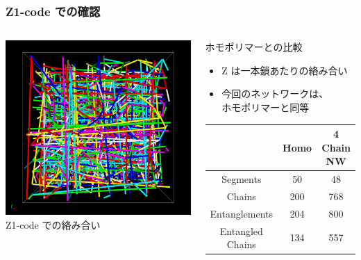 \documentclass[12pt, dvipdfmx]{beamer}
\begin{document}
\begin{frame}
    \frametitle{Z1-code での確認}
        \vspace{-3mm}
        \begin{columns}[T, onlytextwidth]
                \includegraphics[width=\textwidth]{z_cord_4Chain.png}
                Z1-code での絡み合い
            \begin{block}{ホモポリマーとの比較}
                \begin{itemize}
                    \item Z は一本鎖あたりの絡み合い
                    \item 今回のネットワークは、\\ホモポリマーと同等
                \end{itemize}
                \scriptsize
                \begin{center}
                    \begin{tabular}{c||c|c} \hline
                        &Homo & 4 Chain NW \\ \hline \hline
                        Segments& 50& 48 \\ \hline
                        Chains & 200& 768 \\ \hline
                        Entanglements& 204& 800\\ \hline
                        Entangled Chains&134&557 \\ \hline

\end{tabular}
\end{center}
\end{block}
\end{columns}
\end{frame}
\end{document}
